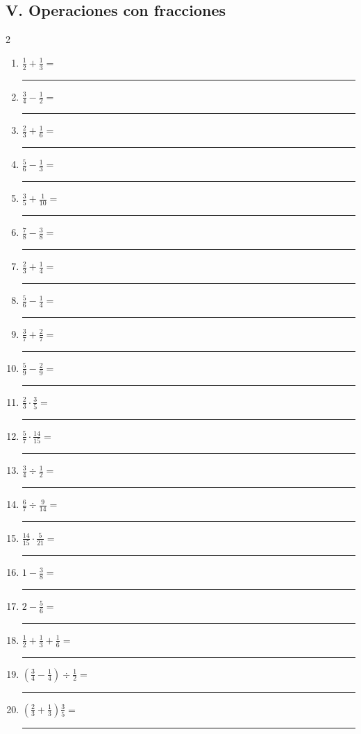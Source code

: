 \documentclass[11pt]{article}
\begin{document}
\subsection*{V. Operaciones con fracciones}
\begin{multicols}{2}\begin{enumerate}[leftmargin=*,start=66]
\item $\displaystyle \frac12+\frac13=$ \rule{2.0cm}{0.4pt}
\item $\displaystyle \frac34-\frac12=$ \rule{2.0cm}{0.4pt}
\item $\displaystyle \frac23+\frac16=$ \rule{2.0cm}{0.4pt}
\item $\displaystyle \frac56-\frac13=$ \rule{2.0cm}{0.4pt}
\item $\displaystyle \frac35+\frac1{10}=$ \rule{2.0cm}{0.4pt}
\item $\displaystyle \frac78-\frac38=$ \rule{2.0cm}{0.4pt}
\item $\displaystyle \frac23+\frac14=$ \rule{2.0cm}{0.4pt}
\item $\displaystyle \frac56-\frac14=$ \rule{2.0cm}{0.4pt}
\item $\displaystyle \frac37+\frac27=$ \rule{2.0cm}{0.4pt}
\item $\displaystyle \frac59-\frac29=$ \rule{2.0cm}{0.4pt}
\item $\displaystyle \frac23\cdot\frac35=$ \rule{2.0cm}{0.4pt}
\item $\displaystyle \frac57\cdot\frac{14}{15}=$ \rule{2.0cm}{0.4pt}
\item $\displaystyle \frac34\div\frac12=$ \rule{2.0cm}{0.4pt}
\item $\displaystyle \frac67\div\frac9{14}=$ \rule{2.0cm}{0.4pt}
\item $\displaystyle \frac{14}{15}\cdot\frac5{21}=$ \rule{2.0cm}{0.4pt}
\item $\displaystyle 1-\frac38=$ \rule{2.0cm}{0.4pt}
\item $\displaystyle 2-\frac56=$ \rule{2.0cm}{0.4pt}
\item $\displaystyle \frac12+\frac13+\frac16=$ \rule{2.0cm}{0.4pt}
\item $\displaystyle \left(\frac34-\frac14\right)\div\frac12=$ \rule{2.0cm}{0.4pt}
\item $\displaystyle \left(\frac23+\frac13\right)\frac35=$ \rule{2.0cm}{0.4pt}
\end{enumerate}\end{multicols}
\end{document}
